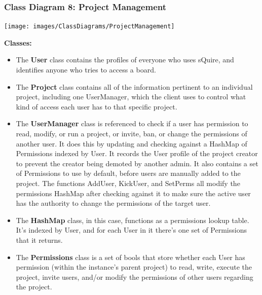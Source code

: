 \documentclass[twoside,letterpaper]{article}
\begin{document}
	\newpage
	
	\subsubsection[Class Diagram 8: Project Management]{\rmfamily\bfseries\color{black}
		Class Diagram 8: Project Management}
	\hypertarget{RefHeading22059017292}{}
	\bigskip
	
	\texttt{[image: images/ClassDiagrams/ProjectManagement]}
	
	\textbf{Classes:}
	\begin{itemize}
	
		\item The \textbf{User} class contains the profiles of everyone who uses sQuire, and identifies anyone who tries to access a board.
		\item The \textbf{Project} class contains all of the information pertinent to an individual project, including one UserManager, which the client uses to control what kind of access each user has to that specific project.
		\item The \textbf{UserManager} class is referenced to check if a user has permission to read, modify, or run a project, or invite, ban, or change the permissions of another user. It does this by updating and checking against a HashMap of Permissions indexed by User. It records the User profile of the project creator to prevent the creator being demoted by another admin. It also contains a set of Permissions to use by default, before users are manually added to the project.
		The functions AddUser, KickUser, and SetPerms all modify the permissions HashMap after checking against it to make sure the active user has the authority to change the permissions of the target user.
		\item The \textbf{HashMap} class, in this case, functions as a permissions lookup table. It's indexed by User, and for each User in it there's one set of Permissions that it returns.
		\item The \textbf{Permissions} class is a set of bools that store whether each User has permission (within the instance's parent project) to read, write, execute the project, invite users, and/or modify the permissions of other users regarding the project.
	\end{itemize}
	
	\newpage
\end{document}
